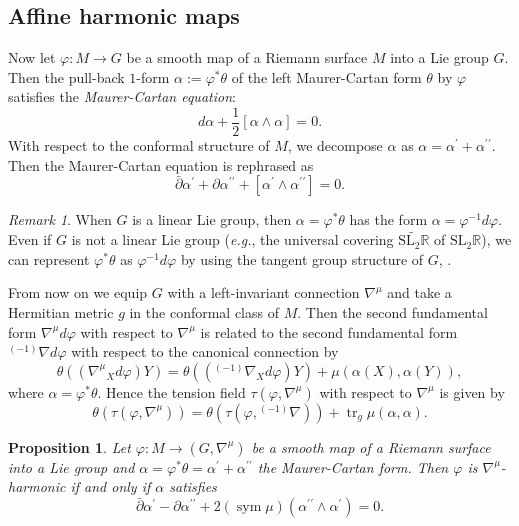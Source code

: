 \documentclass[12pt]{amsart}
\newtheorem{Proposition}[Theorem]{Proposition}
\theoremstyle{definition}
\theoremstyle{remark}
\newtheorem{Remark}[Theorem]{Remark}
\numberwithin{equation}{section}
\begin{document}
\subsection{Affine harmonic maps}
 Now let $\varphi:M\to G$ be a smooth map of a 
 Riemann surface $M$ into a Lie group $G$. 
 Then the pull-back $1$-form $\alpha:=\varphi^{*}\theta$ of the left Maurer-Cartan 
 form $\theta$ by $\varphi$ satisfies the \textit{Maurer-Cartan equation}:
\begin{equation*}
 d\alpha+\frac{1}{2}[\alpha \wedge \alpha]=0.
\end{equation*}
 With respect to the conformal structure of $M$, 
 we decompose $\alpha$ as 
 $\alpha=\alpha^{\prime}+\alpha^{\prime\prime}$. 
 Then the Maurer-Cartan equation is rephrased as
\begin{equation}\label{eq:MCforalpha}
 \bar{\partial}\alpha^{\prime}+\partial\alpha^{\prime\prime}+
 [\alpha^{\prime}\wedge \alpha^{\prime\prime}]=0.
\end{equation}
\begin{Remark}
 When $G$ is a linear Lie group, then $\alpha=\varphi^{*}\theta$ has the form
  $\alpha=\varphi^{-1}d\varphi$. Even if $G$ is not a 
 linear Lie group (\textit{e.g.}, the universal covering 
 $\widetilde{\mathrm{SL}_2\mathbb{R}}$ of $\mathrm{SL}_2\mathbb{R}$),
 we can represent $\varphi^{*}\theta$ as $\varphi^{-1}d\varphi$ by using 
 the tangent group structure of $G$, \cite{Kobayashi}.
\end{Remark}
 From now on we equip $G$ with a left-invariant connection $\nabla^\mu$ and 
 take a Hermitian metric $g$ in the conformal class of $M$. Then 
 the second fundamental form ${\nabla^{\mu}} {d}\varphi$ with 
 respect to $\nabla^\mu$ is 
 related to the second fundamental 
 form ${{}^{(-1)}\nabla} {d} \varphi$ with 
 respect to the 
 canonical connection by
\begin{equation*}
\theta(({\nabla^{\mu}}_{X} d\varphi)Y)= 
\theta(({{}^{(-1)}\nabla}_{X} {d}\varphi)Y)
+\mu(\alpha(X),\alpha(Y)),
\end{equation*}
 where $\alpha =\varphi^* \theta$.
 Hence the tension field $\tau(\varphi,{\nabla^{\mu}})$ 
 with respect to $\nabla^\mu$ is given by
\begin{equation*}
 \theta(\tau(\varphi,{\nabla^{\mu}}))=\theta(\tau(\varphi,{{}^{(-1)}\nabla} ))
 +{\operatorname {tr}_g} \mu(\alpha,\alpha).
\end{equation*}
\begin{Proposition}\label{prop:affine-harmonicity}
 Let $\varphi:M \to (G,{\nabla^{\mu}})$ be a 
 smooth map of a Riemann surface into 
 a Lie group and $\alpha= \varphi^{*}\theta=\alpha^{\prime} +
 \alpha^{\prime \prime}$ the Maurer-Cartan form. Then $\varphi$ 
 is ${\nabla^{\mu}}$-harmonic if and only if $\alpha$ satisfies
\begin{equation}\label{eq:mu-harmonic}
\bar{\partial} \alpha^{\prime}- \partial \alpha^{\prime \prime}
+ 2 ({\operatorname {sym}} \mu) 
 (\alpha^{\prime \prime} \wedge \alpha^{\prime})=0.
\end{equation}
\end{Proposition}
\end{document}
